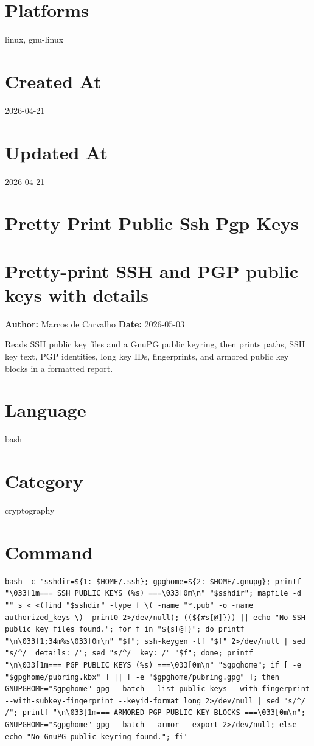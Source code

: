 \documentclass[openany]{book}
\begin{document}
\section*{Platforms}
linux, gnu-linux

\section*{Created At}
2026-04-21

\section*{Updated At}
2026-04-21

\section{Pretty Print Public Ssh Pgp Keys}
\section*{Pretty-print SSH and PGP public keys with details}
\textbf{Author:} Marcos de Carvalho \hfill \textbf{Date:} 2026-05-03

\noindent Reads SSH public key files and a GnuPG public keyring, then prints paths, SSH key text, PGP identities, long key IDs, fingerprints, and armored public key blocks in a formatted report.

\section*{Language}
bash

\section*{Category}
cryptography

\section*{Command}
\begin{lstlisting}
bash -c 'sshdir=${1:-$HOME/.ssh}; gpghome=${2:-$HOME/.gnupg}; printf "\033[1m=== SSH PUBLIC KEYS (%s) ===\033[0m\n" "$sshdir"; mapfile -d "" s < <(find "$sshdir" -type f \( -name "*.pub" -o -name authorized_keys \) -print0 2>/dev/null); ((${#s[@]})) || echo "No SSH public key files found."; for f in "${s[@]}"; do printf "\n\033[1;34m%s\033[0m\n" "$f"; ssh-keygen -lf "$f" 2>/dev/null | sed "s/^/  details: /"; sed "s/^/  key: /" "$f"; done; printf "\n\033[1m=== PGP PUBLIC KEYS (%s) ===\033[0m\n" "$gpghome"; if [ -e "$gpghome/pubring.kbx" ] || [ -e "$gpghome/pubring.gpg" ]; then GNUPGHOME="$gpghome" gpg --batch --list-public-keys --with-fingerprint --with-subkey-fingerprint --keyid-format long 2>/dev/null | sed "s/^/  /"; printf "\n\033[1m=== ARMORED PGP PUBLIC KEY BLOCKS ===\033[0m\n"; GNUPGHOME="$gpghome" gpg --batch --armor --export 2>/dev/null; else echo "No GnuPG public keyring found."; fi' _
\end{lstlisting}
\end{document}

